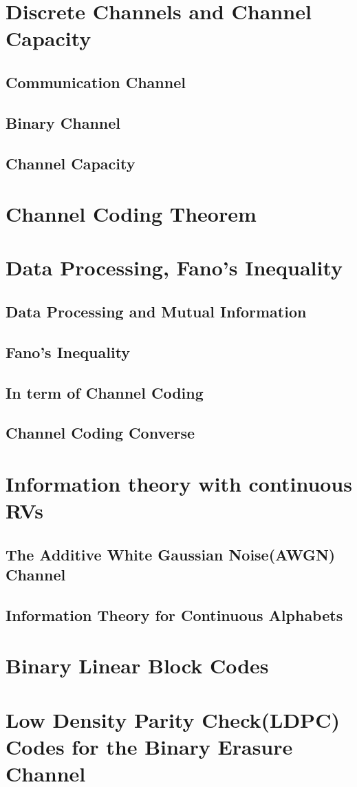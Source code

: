 \documentclass[24pt]{article}
\begin{document}
\section{Discrete Channels and Channel Capacity}

\subsection{Communication Channel}

\subsection{Binary Channel}


\subsection{Channel Capacity}


\section{Channel Coding Theorem}

\section{Data Processing, Fano's Inequality}
\subsection{Data Processing and Mutual Information}
\subsection{Fano's Inequality}

\subsection{In term of Channel Coding}

\subsection{Channel Coding Converse}

\section{Information theory with continuous RVs}

\subsection{The Additive White Gaussian Noise(AWGN) Channel}

\subsection{Information Theory for Continuous Alphabets}

\section{Binary Linear Block Codes}




\section{Low Density Parity Check(LDPC) Codes for the Binary Erasure Channel}
\end{document}
